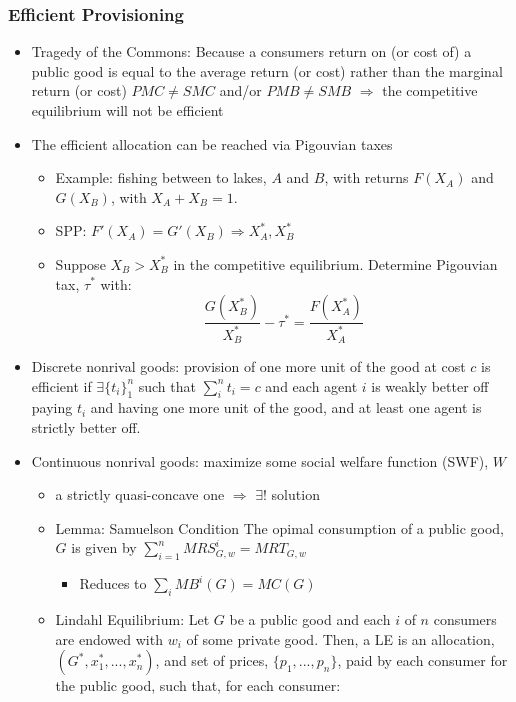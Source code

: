 \documentclass{article}
\newcommand{\blue}[1]{{\color{blue}#1}}
\begin{document}
\subsubsection{Efficient Provisioning}
\begin{itemize}
	\item \blue{Tragedy of the Commons:} Because a consumers return on (or cost of) a public good is equal to the average return (or cost) rather than the marginal return (or cost) $PMC\neq SMC$ and/or $PMB\neq SMB$ $\Rightarrow$ the competitive equilibrium will not be efficient
	\item The efficient allocation can be reached via Pigouvian taxes
		\begin{itemize}
			\item Example: fishing between to lakes, $A$ and $B$, with returns $F(X_A)$ and $G(X_B)$, with $X_A+X_B=1$.
			\item SPP: $F'(X_A)=G'(X_B)\Rightarrow X_A^*,X_B^*$
			\item Suppose $X_B>X_B^*$ in the competitive equilibrium. Determine Pigouvian tax, $\tau^*$ with:
				\[
					\frac{G(X^*_B)}{X_B^*}-\tau^* = \frac{F(X^*_A)}{X_A^*}
				\]
		\end{itemize}
	\item Discrete nonrival goods: provision of one more unit of the good at cost $c$ is efficient if $\exists\{t_i\}_1^n$ such that $\sum_i^nt_i=c$ and each agent $i$ is weakly better off paying $t_i$ and having one more unit of the good, and at least one agent is strictly better off.
	\item Continuous nonrival goods: maximize some social welfare function (SWF), $W$ 
		\begin{itemize}
			\item a strictly quasi-concave one $\Rightarrow$ $\exists!$ solution
			\item \blue{Lemma: Samuelson Condition} The opimal consumption of a public good, $G$ is given by $\sum_{i=1}^nMRS^i_{G,w}=MRT_{G,w}$
				\begin{itemize}
					\item Reduces to $\sum_iMB^i(G)=MC(G)$
				\end{itemize}
			\item \blue{Lindahl Equilibrium:} Let $G$ be a public good and each $i$ of $n$ consumers are endowed with $w_i$ of some private good. Then, a LE is an allocation, ${(G^*,x_1^*,...,x_n^*)}$, and set of prices, $\{p_1,...,p_n\}$, paid by each consumer for the public good, such that, for each consumer:
				\[
\]
\end{itemize}
\end{itemize}
\end{document}
